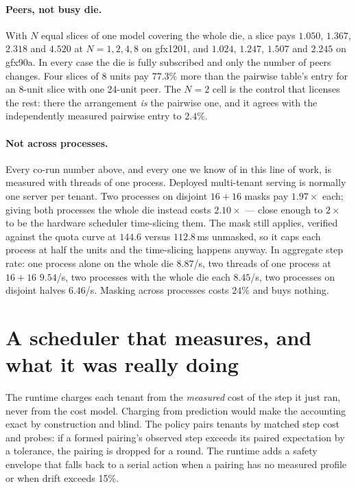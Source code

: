 \documentclass[sigconf,nonacm]{acmart}
\begin{document}
\paragraph{Peers, not busy die.} With $N$ equal slices of one model
covering the whole die, a slice pays $1.050$, $1.367$, $2.318$ and
$4.520$ at $N = 1, 2, 4, 8$ on gfx1201, and $1.024$, $1.247$, $1.507$ and
$2.245$ on gfx90a. In every case the die is fully subscribed and only the
number of peers changes. Four slices of 8 units pay $77.3\%$ more than
the pairwise table's entry for an 8-unit slice with one 24-unit peer. The
$N = 2$ cell is the control that licenses the rest: there the
arrangement \emph{is} the pairwise one, and it agrees with the
independently measured pairwise entry to $2.4\%$.

\paragraph{Not across processes.} Every co-run number above, and every
one we know of in this line of work, is measured with threads of one
process. Deployed multi-tenant serving is normally one server per tenant.
Two processes on disjoint $16{+}16$ masks pay $1.97\times$ each; giving
both processes the whole die instead costs $2.10\times$ --- close enough
to $2\times$ to be the hardware scheduler time-slicing them. The mask
still applies, verified against the quota curve at $144.6$ versus
$112.8$\,ms unmasked, so it caps each process at half the units and the
time-slicing happens anyway. In aggregate step rate: one process alone on
the whole die $8.87$/s, two threads of one process at $16{+}16$
$9.54$/s, two processes with the whole die each $8.45$/s, two processes
on disjoint halves $6.46$/s. Masking across processes costs $24\%$ and
buys nothing.

\section{A scheduler that measures, and what it was really doing}
\label{sec:probe}

The runtime charges each tenant from the \emph{measured} cost of the step
it just ran, never from the cost model. Charging from prediction would
make the accounting exact by construction and blind. The policy pairs
tenants by matched step cost and probes: if a formed pairing's observed
step exceeds its paired expectation by a tolerance, the pairing is
dropped for a round. The runtime adds a safety envelope that falls back
to a serial action when a pairing has no measured profile or when drift
exceeds 15\%.
\end{document}
